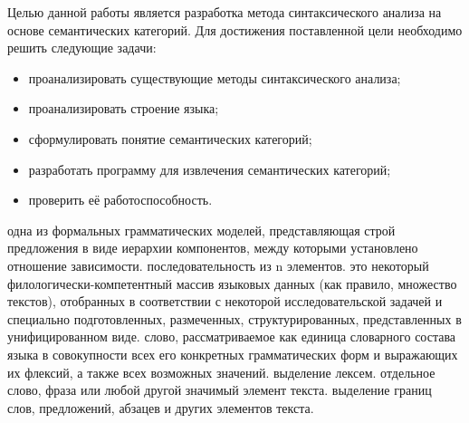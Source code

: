 \Introduction

Целью данной работы является разработка метода синтаксического анализа на основе семантических категорий. Для достижения поставленной цели необходимо решить следующие задачи:

\begin{itemize}
\item проанализировать существующие методы синтаксического анализа;
\item проанализировать строение языка;
\item сформулировать понятие семантических категорий;
\item разработать программу для извлечения семантических категорий;
\item проверить её работоспособность.
\end{itemize}

 {одна из формальных грамматических моделей, представляющая строй предложения в виде иерархии компонентов, между которыми установлено отношение зависимости.}
 {последовательность из n элементов.}
 { это некоторый филологически-компетентный массив языковых данных (как правило, множество текстов), отобранных в соответствии с некоторой исследовательской задачей и специально подготовленных, размеченных, структурированных, представленных в унифицированном виде.}
 {слово, рассматриваемое как единица словарного состава языка в совокупности всех его конкретных грамматических форм и выражающих их флексий, а также всех возможных значений.}
 {выделение лексем.}
 {отдельное слово, фраза или любой другой значимый элемент текста.}
 {выделение границ слов, предложений, абзацев и других элементов текста.}